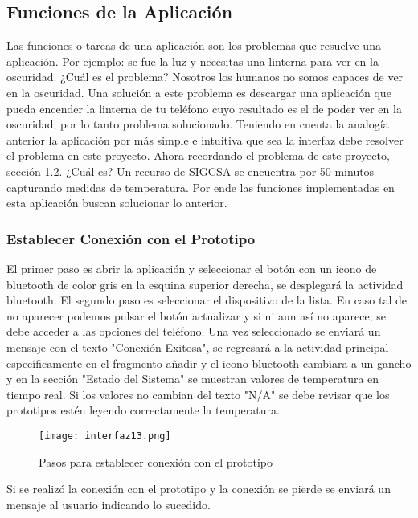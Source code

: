 \subsection{Funciones de la Aplicación}

\par 
Las funciones o tareas de una aplicación son los problemas que resuelve una aplicación. Por ejemplo: se fue la luz y necesitas una linterna para ver en la oscuridad. ¿Cuál es el problema? Nosotros los humanos no somos capaces de ver en la oscuridad. Una solución a este problema es descargar una aplicación que pueda encender la linterna de tu teléfono cuyo resultado es el de poder ver en la oscuridad; por lo tanto problema solucionado. Teniendo en cuenta la analogía anterior la aplicación por más simple e intuitiva que sea la interfaz debe resolver el problema en este proyecto. Ahora recordando el problema de este proyecto, sección 1.2. ¿Cuál es? Un recurso de SIGCSA se encuentra por 50 minutos capturando medidas de temperatura. Por ende las funciones implementadas en esta aplicación buscan solucionar lo anterior.

\subsubsection{Establecer Conexión con el Prototipo}

\par 
El primer paso es abrir la aplicación y seleccionar el botón con un icono de bluetooth de color gris en la esquina superior derecha, se desplegará la actividad bluetooth. El segundo paso es seleccionar el dispositivo de la lista. En caso tal de no aparecer podemos pulsar el botón actualizar y si ni aun así no aparece, se debe acceder a las opciones del teléfono. Una vez seleccionado se enviará un mensaje con el texto "Conexión Exitosa", se regresará a la actividad principal específicamente en el fragmento añadir y el icono bluetooth cambiara a un gancho y en la sección "Estado del Sistema" se muestran valores de temperatura en tiempo real. Si los valores no cambian del texto "N/A" se debe revisar que los prototipos estén leyendo correctamente la temperatura.

\begin{figure}[H]
	\centering
	\texttt{[image: interfaz13.png]}
	\caption{Pasos para establecer conexión con el prototipo}
\end{figure}

\par \noindent
Si se realizó la conexión con el prototipo y la conexión se pierde se enviará un mensaje al usuario indicando lo sucedido.

